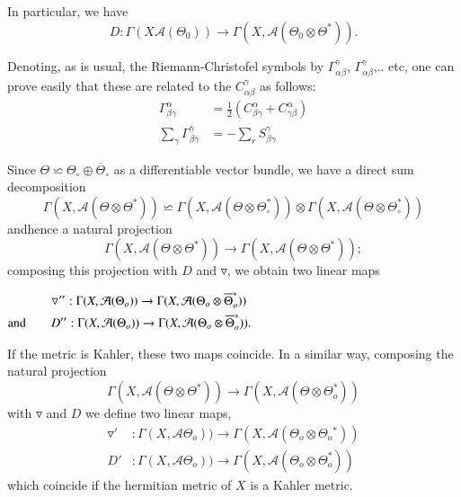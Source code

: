 In particular, we have
$$  
D:\Gamma (X \mathcal{A}(\Theta_0)) \to \Gamma (X, \mathcal{A}(\Theta_0
\otimes \Theta^*)).
$$

Denoting, as is usual, the Riemann-Christofel symbols by
$\Gamma^{\gamma}_{\alpha \beta}$, $\Gamma^{\gamma}_{\alpha \beta}$,.. etc, 
one can prove easily that these are related to the $C^{\gamma}_{\alpha
  \beta}$ as follows: 
\begin{align*}
  \Gamma^{\alpha}_{\beta \gamma}  &= \frac{1}{2} (C^{\alpha}_{\beta
    \gamma} + C^{\alpha}_{\gamma \beta})\\ 
  \sum\limits_\gamma \Gamma^{\bar{\gamma}}_{\beta \bar{\gamma}} &=-\sum\limits_r
  S^{\gamma}_{\beta \gamma } 
\end{align*}

Since $\Theta \backsimeq \Theta_\circ \oplus \overline{\Theta} _\circ$ as a
differentiable vector bundle, we have a direct sum decomposition  
$$
\Gamma (X,\mathcal{A}(\Theta \otimes \Theta^*))\backsimeq \Gamma
(X,\mathcal{A}(\Theta \otimes \Theta^*_\circ))\otimes\Gamma
(X,\mathcal{A}(\Theta \otimes \Theta^*_\circ))
$$
and\pageoriginale hence a natural projection
$$
\Gamma (X, \mathcal{A}(\Theta \otimes \Theta ^*))\rightarrow \Gamma
(X, \mathcal{A}(\Theta \otimes \Theta ^*));
$$
composing this projection with $D$ and $\triangledown$,  we obtain two
linear maps 

$\begin{aligned}
& \qquad  {\triangledown'' : \Gamma (X, \mathcal{A}(\Theta
    _o))\rightarrow \Gamma  (X,\mathcal{A}(\Theta_o \otimes
    \overline{\Theta}_o^{*}))}\\ 
{\rm and}  & \qquad    {D'' : \Gamma (X, \mathcal
  {A}(\Theta_o))\rightarrow \Gamma (X,\mathcal{A}(\Theta _o \otimes
  \overline{\Theta}_o^{*}))}. 
\end{aligned}$

If the metric is Kahler, these two maps coincide.
In a similar way, composing the natural projection
$$ 
\Gamma (X, \mathcal{A}(\Theta \otimes \Theta^*))\rightarrow \Gamma
(X,\mathcal{A}(\Theta \otimes \Theta_o^{*}))
$$
with $\triangledown$ and  $D$ we define two linear maps,
\begin{align*}
  \triangledown' &: \Gamma (X, \mathcal{A} \Theta_o))\rightarrow
  \Gamma (X,\mathcal{A}(\Theta_o \otimes \Theta_o{^*}))\\
  D' & : \Gamma (X, \mathcal{A} \Theta_o)) \rightarrow \Gamma (X,
  \mathcal{A}(\Theta_o \otimes \Theta_{o}^{*}))
\end{align*}
which coincide if the hermitian metric of $X$ is a Kahler metric.

